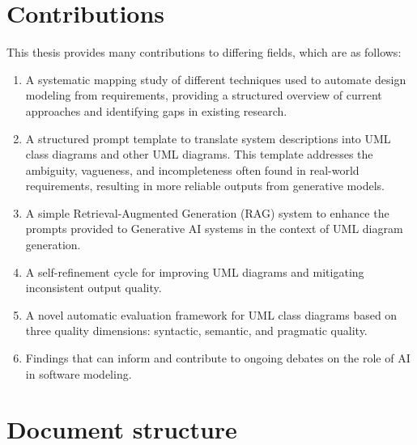 \section{Contributions}
\label{sec:contributions}
This thesis provides many contributions to differing fields, which are as follows:
\begin{enumerate}
    \item A systematic mapping study of different techniques used to automate design modeling from requirements, providing a structured overview of current approaches and identifying gaps in existing research.
    \item A structured prompt template to translate system descriptions into UML class diagrams and other UML diagrams. This template addresses the ambiguity, vagueness, and incompleteness often found in real-world requirements, resulting in more reliable outputs from generative models.
    \item A simple Retrieval-Augmented Generation (RAG) system to enhance the prompts provided to Generative AI systems in the context of UML diagram generation.
    \item A self-refinement cycle for improving UML diagrams and mitigating inconsistent output quality.
    \item A novel automatic evaluation framework for UML class diagrams based on three quality dimensions: syntactic, semantic, and pragmatic quality.
    \item Findings that can inform and contribute to ongoing debates on the role of AI in software modeling.
\end{enumerate}


\section{Document structure}
\label{sec:document_structure}

